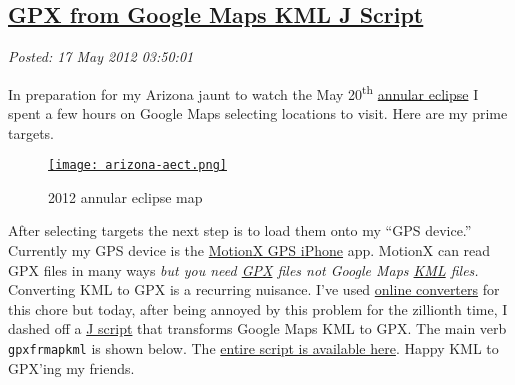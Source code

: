%

\subsection*{\href{https://bakerjd99.wordpress.com/2012/05/16/gpx-from-google-maps-kml-j-script/}{GPX from Google Maps KML J Script}}


\noindent\emph{Posted: 17 May 2012 03:50:01}
\vspace{6pt}

In preparation for my Arizona jaunt to watch the May
20\textsuperscript{th}
\href{http://eclipse-maps.com/Eclipse-Maps/Gallery/Pages/Annular\_solar\_eclipse\_of\_2012\_May\_20.html}{annular
eclipse} I spent a few hours on Google Maps selecting locations to
visit. Here are my prime targets.

\captionsetup[figure]{labelformat=empty}
\begin{figure}[htbp]
\centering
\href{http://maps.google.com/maps/ms?msid=213851645709730088342.0004bd67c9be9e39b4797&msa=0}{\texttt{[image: arizona-aect.png]}}
\caption{2012 annular eclipse map}
\label{fig:119X0}
\end{figure}


After selecting targets the next step is to load them onto my ``GPS
device.'' Currently my GPS device is the
\href{http://gps.motionx.com/iphone/overview/}{MotionX GPS iPhone} app.
MotionX can read GPX files in many ways \emph{but you need
\href{http://www.topografix.com/gpx.asp}{GPX} files not Google Maps
\href{https://developers.google.com/kml/documentation/}{KML} files.}
Converting KML to GPX is a recurring nuisance. I've used
\href{http://kml2gpx.com/}{online converters} for this chore but today,
after being annoyed by this problem for the zillionth time, I dashed off
a \href{http://www.jsoftware.com/jwiki/FrontPage}{J script} that
transforms Google Maps KML to GPX. The main verb \texttt{gpxfrmapkml} is
shown below. The
\href{https://github.com/bakerjd99/jacks/blob/master/geotagged/gpxfrmapkml.ijs}{entire script is
available here}. Happy KML to GPX'ing my friends.


